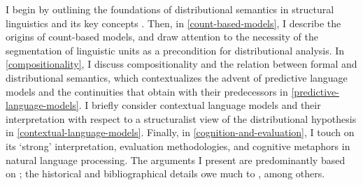 I begin by outlining the foundations of distributional semantics in structural
linguistics and its key concepts .
Then, in \cref{count-based-models}, I describe the origins of count-based models, and
draw attention to the necessity of the segmentation of linguistic units as a
precondition for distributional analysis.
In \cref{compositionality}, I discuss compositionality and the relation between formal
and distributional semantics, which contextualizes the advent of predictive language
models and the continuities that obtain with their predecessors in
\cref{predictive-language-models}.
I briefly consider contextual language models and their interpretation with respect to
a structuralist view of the distributional hypothesis in
\cref{contextual-language-models}.
Finally, in \cref{cognition-and-evaluation}, I touch on its `strong' interpretation,
evaluation methodologies, and cognitive metaphors in natural language processing.
The arguments I present are predominantly based on
\textcites{Gastaldi2021}{Gastaldi2021a}{Westera2019}{Hacker2019}; the historical and
bibliographical details owe much to \textcites{Sahlgren2008}{Lenci2008}{Lenci2023},
among others.
